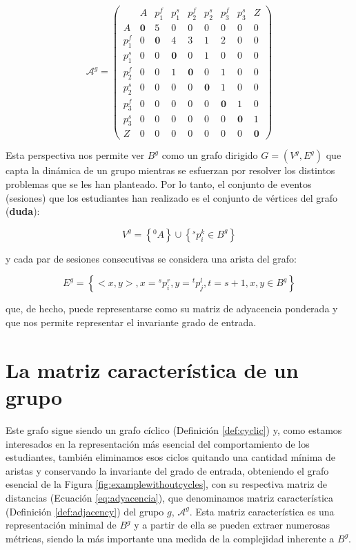 \begin{equation}\label{eq:adyacencia}
\mathcal{A}^g = 
\left(
\begin{array}{c|cccccccc}
    & A & p_1^f & p_1^s & p_2^f & p_2^s & p_3^f & p_3^s & Z \\
  \hline
  A & \textbf{0} & 5 & 0 & 0 & 0 & 0 & 0 & 0 \\
  p_1^f & 0 & \textbf{0} & 4 & 3 & 1 & 2 & 0 & 0 \\
  p_1^s & 0 & 0 & \textbf{0} & 0 & 1 & 0 & 0 & 0 \\
  p_2^f & 0 & 0 & 1 & \textbf{0} & 0 & 1 & 0 & 0 \\
  p_2^s & 0 & 0 & 0 & 0 & \textbf{0} & 1 & 0 & 0 \\
  p_3^f & 0 & 0 & 0 & 0 & 0 & \textbf{0} & 1 & 0\\
  p_3^s & 0 & 0 & 0 & 0 & 0 & 0 & \textbf{0} & 1 \\
  Z & 0 & 0 & 0 & 0 & 0 & 0 & 0 & \textbf{0}
\end{array}
\right)
\end{equation}

Esta perspectiva nos permite ver $B^g$ como un grafo dirigido $G = (V^g,E^g)$ que capta la dinámica de un grupo mientras se esfuerzan por resolver los distintos problemas que se les han planteado. Por lo tanto, el conjunto de eventos (sesiones) que los estudiantes han realizado es el conjunto de vértices del grafo (\textbf{duda}):

\begin{equation}
V^g = \left\lbrace ^0A \right\rbrace \cup \left\lbrace ^sp_i^k \in B^g \right\rbrace
\end{equation}

y cada par de sesiones consecutivas se considera una arista del grafo:

\begin{equation}
E^g = \left\lbrace <x,y>, x = {}^sp_i^r, y = {}^tp_j^l, t = s+1, x,y \in B^g\right\rbrace
\end{equation}

que, de hecho, puede representarse como su matriz de adyacencia ponderada y que nos permite representar el invariante grado de entrada.

\section{La matriz característica de un grupo}

Este grafo sigue siendo un grafo cíclico (Definición \ref{def:cyclic}) y, como estamos interesados en la representación más esencial del comportamiento de los estudiantes, también eliminamos esos ciclos quitando una cantidad mínima de aristas y conservando la invariante del grado de entrada, obteniendo el grafo esencial de la Figura \ref{fig:examplewithoutcycles}, con su respectiva matriz de distancias (Ecuación \ref{eq:adyacencia}), que denominamos matriz característica (Definición \ref{def:adjacency}) del grupo $g$, $\mathcal{A}^g$. Esta matriz característica es una representación minimal de $B^g$ y a partir de ella se pueden extraer numerosas métricas, siendo la más importante una medida de la complejidad inherente a $B^g$.

